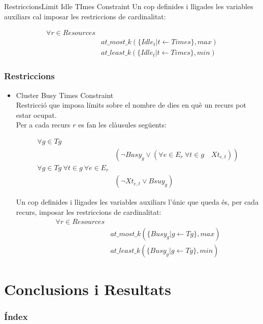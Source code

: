 \documentclass[11pt]{beamer}
\begin{document}
      \begin{frame}{Restriccions}{Limit Idle TImes Constraint}
       Un cop definides i lligades les variables auxiliars cal imposar les restriccions de cardinalitat:
    
       \begin{align*}
        \forall r \in Resources &\\
        & at\_most\_k(\{ Idle_t | t \leftarrow Times\}, max) \\
        & at\_least\_k(\{ Idle_t | t \leftarrow Times\}, min)
       \end{align*}
  
  \end{frame}
  \begin{frame}
    \frametitle{Restriccions}

    \begin{itemize}
    
      \item Cluster Busy Times Constraint \\
      Restricció que imposa límits sobre el nombre de dies en què un recurs pot estar ocupat.\\
      Per a cada recurs $r$ es fan les clàusules següents:
      
      \begin{align*}
        \forall g \in Tg & \\
        &(\neg Busy_g \lor (\forall e \in E_r \ \forall t \in g \quad Xt_{e,t}))\\
        \forall g \in Tg \ \forall t \in g \ \forall e \in E_r &\\
        & (\neg Xt_{e,t} \lor Bsuy_g)
      \end{align*}
    
      Un cop definides i lligades les variables auxiliars l'únic que queda és, per cada recurs, imposar les restriccions de cardinalitat:
      \begin{align*}
        \forall r \in Resources &\\
        & at\_most\_k(\{ Busy_g | g \leftarrow Tg\}, max) \\
        & at\_least\_k(\{ Busy_g | g \leftarrow Tg\}, min)
       \end{align*}
          
    \end{itemize}
  
  \end{frame}


  \section{Conclusions i Resultats}
  \begin{frame}
    \frametitle{Índex}
    \tableofcontents[currentsection]
  \end{frame}
\end{document}
